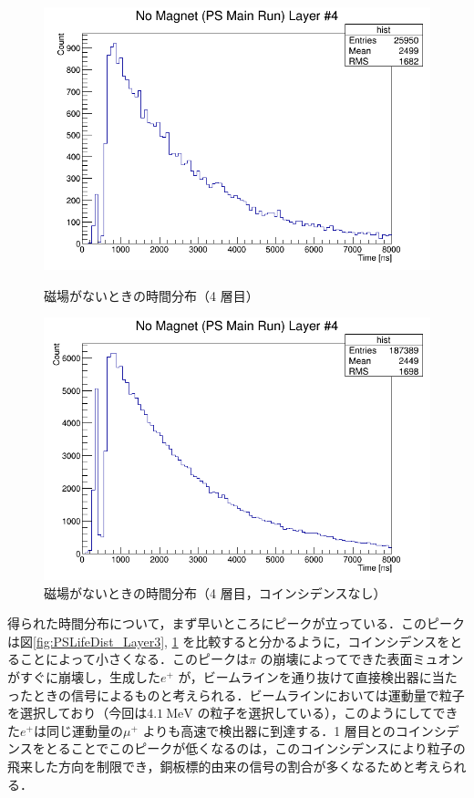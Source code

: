 \begin{figure}[h]
\begin{minipage}{0.45\textwidth}
	\includegraphics[width = \textwidth]{figure/odagawa/PSLifetimeDist_Layer3.png}
	\caption{磁場がないときの時間分布（4 層目）}
	\label{fig:PSLifeDist_Layer3}
	\end{minipage}
	\begin{minipage}{0.45\textwidth}
	\centering
	\includegraphics[width = \textwidth]{figure/odagawa/PSLifetimeDistNoCoin_Layer3.png}
	\caption{磁場がないときの時間分布（4 層目，コインシデンスなし）}
	\label{fig:PSLifeDistNoCoin_Layer3}
	\end{minipage}
\end{figure}%

得られた時間分布について，まず早いところにピークが立っている．このピークは図\ref{fig:PSLifeDist_Layer3}, \ref{fig:PSLifeDistNoCoin_Layer3} を比較すると分かるように，コインシデンスをとることによって小さくなる．このピークは$\pi$ の崩壊によってできた表面ミュオンがすぐに崩壊し，生成した$e^{+}$ が，ビームラインを通り抜けて直接検出器に当たったときの信号によるものと考えられる．ビームラインにおいては運動量で粒子を選択しており（今回は$4.1~\mathrm{MeV}$ の粒子を選択している），このようにしてできた$e^{+}$は同じ運動量の$\mu^{+}$ よりも高速で検出器に到達する．1 層目とのコインシデンスをとることでこのピークが低くなるのは，このコインシデンスにより粒子の飛来した方向を制限でき，銅板標的由来の信号の割合が多くなるためと考えられる．

